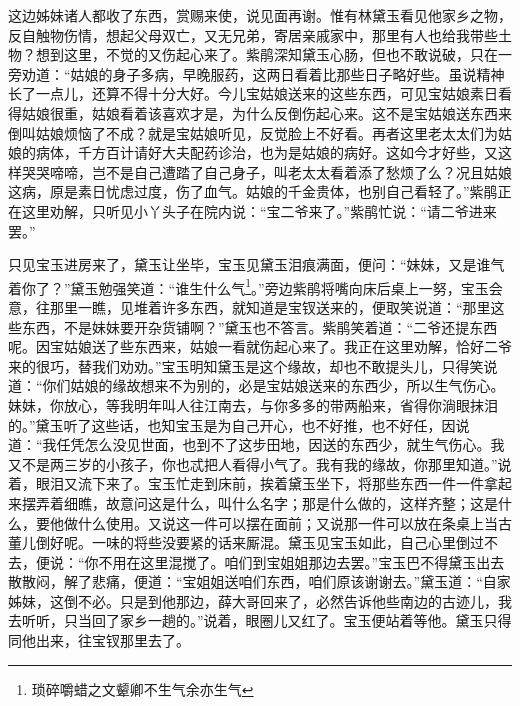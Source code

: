 \documentclass[12pt,oneside]{book}
\begin{document}
这边姊妹诸人都收了东西，赏赐来使，说见面再谢。惟有林黛玉看见他家乡之物，反自触物伤情，想起父母双亡，又无兄弟，寄居亲戚家中，那里有人也给我带些土物？想到这里，不觉的又伤起心来了。紫鹃深知黛玉心肠，但也不敢说破，只在一旁劝道：“姑娘的身子多病，早晚服药，这两日看着比那些日子略好些。虽说精神长了一点儿，还算不得十分大好。今儿宝姑娘送来的这些东西，可见宝姑娘素日看得姑娘很重，姑娘看着该喜欢才是，为什么反倒伤起心来。这不是宝姑娘送东西来倒叫姑娘烦恼了不成？就是宝姑娘听见，反觉脸上不好看。再者这里老太太们为姑娘的病体，千方百计请好大夫配药诊治，也为是姑娘的病好。这如今才好些，又这样哭哭啼啼，岂不是自己遭踏了自己身子，叫老太太看着添了愁烦了么？况且姑娘这病，原是素日忧虑过度，伤了血气。姑娘的千金贵体，也别自己看轻了。”紫鹃正在这里劝解，只听见小丫头子在院内说：“宝二爷来了。”紫鹃忙说：“请二爷进来罢。”

只见宝玉进房来了，黛玉让坐毕，宝玉见黛玉泪痕满面，便问：“妹妹，又是谁气着你了？”黛玉勉强笑道：“谁生什么气\footnote{琐碎嚼蜡之文颦卿不生气余亦生气}。”旁边紫鹃将嘴向床后桌上一努，宝玉会意，往那里一瞧，见堆着许多东西，就知道是宝钗送来的，便取笑说道：“那里这些东西，不是妹妹要开杂货铺啊？”黛玉也不答言。紫鹃笑着道：“二爷还提东西呢。因宝姑娘送了些东西来，姑娘一看就伤起心来了。我正在这里劝解，恰好二爷来的很巧，替我们劝劝。”宝玉明知黛玉是这个缘故，却也不敢提头儿，只得笑说道：“你们姑娘的缘故想来不为别的，必是宝姑娘送来的东西少，所以生气伤心。妹妹，你放心，等我明年叫人往江南去，与你多多的带两船来，省得你淌眼抹泪的。”黛玉听了这些话，也知宝玉是为自己开心，也不好推，也不好任，因说道：“我任凭怎么没见世面，也到不了这步田地，因送的东西少，就生气伤心。我又不是两三岁的小孩子，你也忒把人看得小气了。我有我的缘故，你那里知道。”说着，眼泪又流下来了。宝玉忙走到床前，挨着黛玉坐下，将那些东西一件一件拿起来摆弄着细瞧，故意问这是什么，叫什么名字；那是什么做的，这样齐整；这是什么，要他做什么使用。又说这一件可以摆在面前；又说那一件可以放在条桌上当古董儿倒好呢。一味的将些没要紧的话来厮混。黛玉见宝玉如此，自己心里倒过不去，便说：“你不用在这里混搅了。咱们到宝姐姐那边去罢。”宝玉巴不得黛玉出去散散闷，解了悲痛，便道：“宝姐姐送咱们东西，咱们原该谢谢去。”黛玉道：“自家姊妹，这倒不必。只是到他那边，薛大哥回来了，必然告诉他些南边的古迹儿，我去听听，只当回了家乡一趟的。”说着，眼圈儿又红了。宝玉便站着等他。黛玉只得同他出来，往宝钗那里去了。　　
\end{document}
